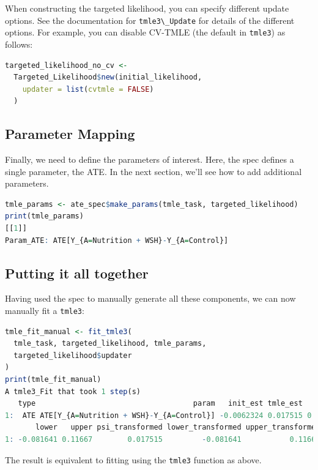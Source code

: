 \documentclass[
  12pt, krantz2,
]{book}
\newcommand{\passthrough}[1]{#1}
\theoremstyle{definition}
\theoremstyle{definition}
\theoremstyle{definition}
\newcommand{\1}{\mathbbm{1}}
\begin{document}
When constructing the targeted likelihood, you can specify different update
options. See the documentation for \passthrough{\lstinline!tmle3\_Update!} for details of the different
options. For example, you can disable CV-TMLE (the default in \passthrough{\lstinline!tmle3!}) as
follows:

\begin{lstlisting}[language=R]
targeted_likelihood_no_cv <-
  Targeted_Likelihood$new(initial_likelihood,
    updater = list(cvtmle = FALSE)
  )
\end{lstlisting}

\hypertarget{parameter-mapping}{%
\subsection{Parameter Mapping}\label{parameter-mapping}}

Finally, we need to define the parameters of interest. Here, the spec defines a
single parameter, the ATE. In the next section, we'll see how to add additional
parameters.

\begin{lstlisting}[language=R]
tmle_params <- ate_spec$make_params(tmle_task, targeted_likelihood)
print(tmle_params)
[[1]]
Param_ATE: ATE[Y_{A=Nutrition + WSH}-Y_{A=Control}]
\end{lstlisting}

\hypertarget{putting-it-all-together}{%
\subsection{Putting it all together}\label{putting-it-all-together}}

Having used the spec to manually generate all these components, we can now
manually fit a \passthrough{\lstinline!tmle3!}:

\begin{lstlisting}[language=R]
tmle_fit_manual <- fit_tmle3(
  tmle_task, targeted_likelihood, tmle_params,
  targeted_likelihood$updater
)
print(tmle_fit_manual)
A tmle3_Fit that took 1 step(s)
   type                                    param   init_est tmle_est       se
1:  ATE ATE[Y_{A=Nutrition + WSH}-Y_{A=Control}] -0.0062324 0.017515 0.050591
       lower   upper psi_transformed lower_transformed upper_transformed
1: -0.081641 0.11667        0.017515         -0.081641           0.11667
\end{lstlisting}

The result is equivalent to fitting using the \passthrough{\lstinline!tmle3!} function as above.
\end{document}

